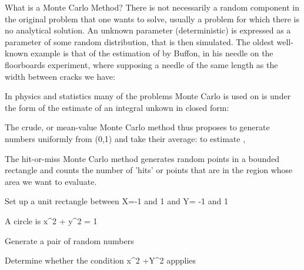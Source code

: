 What is a Monte Carlo Method?
There is not necessarily a random component in the original problem that one wants to solve, usually a problem for which there is no analytical solution. An unknown parameter (deterministic) is expressed as a parameter of some random distribution, that is then simulated. 
The oldest well-known example is that of the estimation of  by Buffon, in his needle on the floorboards experiment, where supposing a needle of the same length as the width between cracks we have: 


In physics and statistics many of the problems Monte Carlo is used on is under the form of the estimate of an integral unkown in closed form: 


The crude, or mean-value Monte Carlo method thus proposes to generate  numbers uniformly from (0,1) and take their average: to estimate , 


The hit-or-miss Monte Carlo method generates random points in a bounded rectangle and counts the number of 'hits' or points that are in the region whose area we want to evaluate. 


Set up a unit rectangle between X=-1 and 1 and Y= -1 and 1

A circle is x^2 + y^2 = 1

Generate a pair of random numbers

Determine whether the condition x^2 +Y^2   appplies



